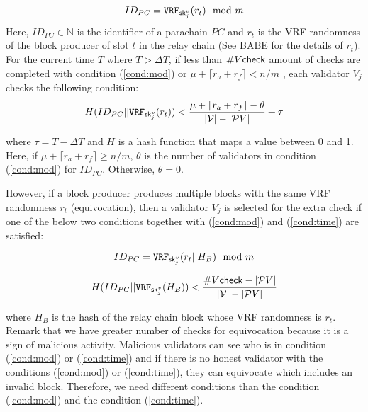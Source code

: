 \begin{enumerate}
    \begin{equation}\label{cond:mod}
        ID_{PC} = \mathtt{VRF}_{\mathsf{sk}^v_{j}}(r_{t}) \mod m    
    \end{equation}
     Here, $ID_{PC} \in \mathbb{N}$ is the identifier of a parachain $PC$ and $r_{t}$ is the VRF randomness of the block producer of slot $t$ in the relay chain (See \href{http://research.web3.foundation/en/latest/polkadot/BABE/Babe/}{BABE} for the details of $r_t$). For the current time $T$ where $T > \Delta T$, if  less than $\#V\mathsf{check}$ amount of checks are completed with condition (\ref{cond:mod}) or $\mu + \lceil r_a + r_f \rceil < n/m$ , each validator $V_j$ checks the following condition:
     \begin{equation}\label{cond:time}
        H(ID_{PC} || \mathtt{VRF}_{\mathsf{sk}^v_j}(r_t)) < \frac{\mu + \lceil r_a + r_f \rceil - \theta}{|\mathcal{V}|-|\mathcal{P}V|}+\tau  
    \end{equation}
    
      where $\tau = T- \Delta T$ and $H$ is a hash function that maps a value between 0 and 1. Here, if $\mu + \lceil r_a + r_f \rceil \geq n/m$, $\theta$ is the number of validators in condition (\ref{cond:mod}) for $ID_{PC}$. Otherwise, $\theta = 0$.
    
    However, if a block producer produces multiple blocks with the same VRF randomness $r_t$ (equivocation), then a validator $V_j$ is selected for the extra check if one of the  below two conditions together with (\ref{cond:mod}) and (\ref{cond:time}) are satisfied:
    
    
    \begin{equation}\label{cond:modequiv}
         ID_{PC} = \mathtt{VRF}_{\mathsf{sk}^v_{j}}(r_{t}||H_B) \mod m
    \end{equation}
    
    \begin{equation}\label{cond:equiv}
         H(ID_{PC} || \mathtt{VRF}_{\mathsf{sk}^v_j}(H_{B})) < \frac{\#V\mathsf{check} - |\mathcal{P}V|}{|\mathcal{V}|-|\mathcal{P}V|}   
    \end{equation}
    
     where $H_B$ is the hash of the relay chain block whose VRF randomness is $r_t$. Remark that we have greater number of checks for equivocation because it is a sign of malicious activity. Malicious validators can see who is in condition (\ref{cond:mod}) or (\ref{cond:time}) and if there is  no honest validator with the conditions (\ref{cond:mod}) or (\ref{cond:time}), they can equivocate which includes an invalid block. Therefore, we need different conditions than the condition (\ref{cond:mod}) and the condition (\ref{cond:time}).
    

\end{enumerate}
